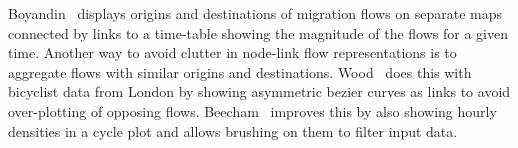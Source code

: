 Boyandin~\etal\cite{Boyandin2011} displays origins and
destinations of migration flows on separate maps connected
by links to a time-table showing the magnitude of the flows
for a given time.
Another way to avoid clutter in node-link
flow representations is to aggregate flows with
similar origins and destinations.
Wood~\etal\cite{Wood2011} does this with bicyclist data from London
by showing asymmetric bezier curves as links to avoid
over-plotting of opposing flows.
Beecham~\etal\cite{Beecham2012} improves
this by also showing hourly densities in a cycle plot and
allows brushing on them to filter input data.
